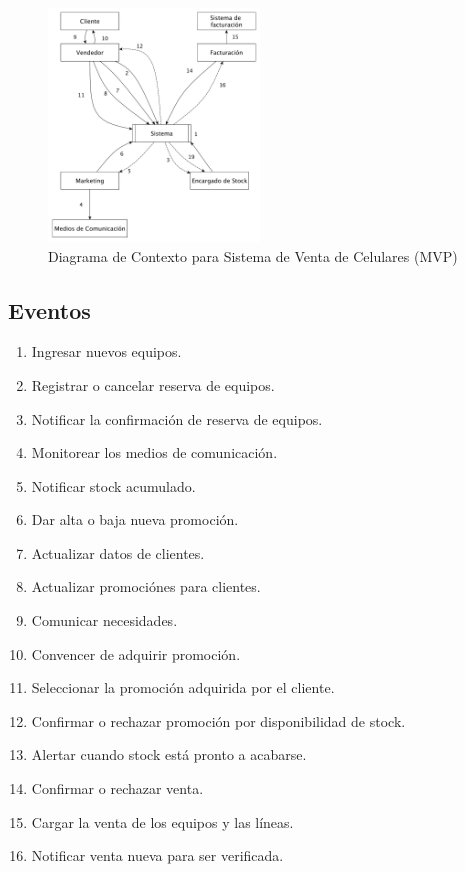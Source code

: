\begin{figure}[h!]
  \centering
  \includegraphics[width=0.5\textwidth]{./imagenes/contexto_2.pdf}
  \caption{Diagrama de Contexto para Sistema de Venta de Celulares (MVP)}
\end{figure}

\subsection{Eventos}

\begin{enumerate}

  \item Ingresar nuevos equipos.
  \item Registrar o cancelar reserva de equipos.
  \item Notificar la confirmación de reserva de equipos.
  \item Monitorear los medios de comunicación.
  \item Notificar stock acumulado.
  \item Dar alta o baja nueva promoción.
  \item Actualizar datos de clientes.
  \item Actualizar promociónes para clientes.
  \item Comunicar necesidades.
  \item Convencer de adquirir promoción.
  \item Seleccionar la promoción adquirida por el cliente.
  \item Confirmar o rechazar promoción por disponibilidad de stock.
  \item Alertar cuando stock está pronto a acabarse.
  \item Confirmar o rechazar venta.
  \item Cargar la venta de los equipos y las líneas.
  \item Notificar venta nueva para ser verificada.

\end{enumerate}

